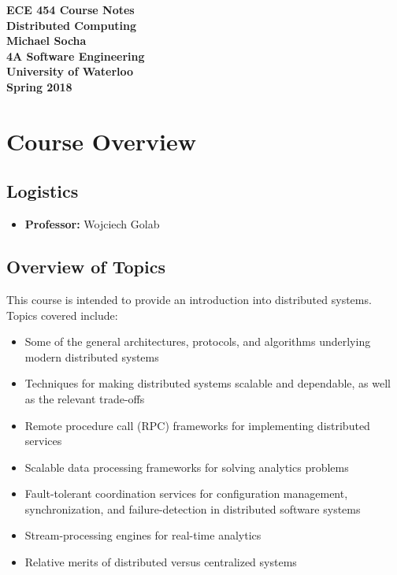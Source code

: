 \documentclass[12pt,titlepage]{article}
\begin{document}
  \begin{titlepage}
    \vspace*{\fill}
    \centering

    \textbf{\Huge ECE 454 Course Notes} \\ [0.4em]
    \textbf{\Large Distributed Computing} \\ [1em]
    \textbf{\Large Michael Socha} \\ [1em]
    \textbf{\large 4A Software Engineering} \\
    \textbf{\large University of Waterloo} \\
    \textbf{\large Spring 2018} \\
    \vspace*{\fill}
  \end{titlepage}

  \newpage 


  \tableofcontents

  \newpage


  \section{Course Overview}

    \subsection{Logistics}
      \begin{itemize}
        \item \textbf{Professor:} Wojciech Golab
      \end{itemize}

    \subsection{Overview of Topics}
      This course is intended to provide an introduction into distributed systems. Topics covered include:
      \begin{itemize}
        \item Some of the general architectures, protocols, and algorithms underlying modern distributed systems
        \item Techniques for making distributed systems scalable and dependable, as well as the relevant trade-offs
        \item Remote procedure call (RPC) frameworks for implementing distributed services
        \item Scalable data processing frameworks for solving analytics problems
        \item Fault-tolerant coordination services for configuration management, synchronization, and failure-detection
          in distributed software systems
        \item Stream-processing engines for real-time analytics
        \item Relative merits of distributed versus centralized systems
      \end{itemize}
\end{document}
